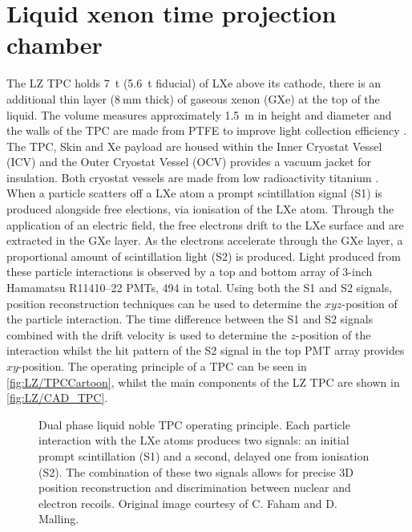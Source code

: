 \section{Liquid xenon time projection chamber}\label{sec:LZ/LXeTPC}
The LZ TPC holds 7~t (5.6~t fiducial) of LXe above its cathode, there is an additional thin layer ($8~\text{mm}$ thick) of gaseous xenon (GXe) at the top of the liquid. The volume measures approximately 1.5~m in height and diameter and the walls of the TPC are made from PTFE to improve light collection efficiency \cite{LZNIMA}. The TPC, Skin and Xe payload are housed within the Inner Cryostat Vessel (ICV) and the Outer Cryostat Vessel (OCV) provides a vacuum jacket for insulation. Both cryostat vessels are made from low radioactivity titanium \cite{LZ:2017iwn}. When a particle scatters off a LXe atom a prompt scintillation signal (S1) is produced alongside free elections, via ionisation of the LXe atom. Through the application of an electric field, the free electrons drift to the LXe surface and are extracted in the GXe layer. As the electrons accelerate through the GXe layer, a proportional amount of scintillation light (S2) is produced. Light produced from these particle interactions is observed by a top and bottom array of 3-inch Hamamatsu R11410–22 PMTs, 494 in total. Using both the S1 and S2 signals, position reconstruction techniques can be used to determine the $xyz$-position of the particle interaction. The time difference between the S1 and S2 signals combined with the drift velocity is used to determine the $z$-position of the interaction whilst the hit pattern of the S2 signal in the top PMT array provides $xy$-position. The operating principle of a TPC can be seen in \autoref{fig:LZ/TPCCartoon}, whilst the main components of the LZ TPC are shown in \autoref{fig:LZ/CAD_TPC}.
\begin{figure}[!ht]
    \centering
    
    \caption{Dual phase liquid noble TPC operating principle. Each particle interaction with the LXe atoms produces two signals: an initial prompt scintillation (S1) and a second, delayed one from ionisation (S2). The combination of these two signals allows for precise 3D position reconstruction and discrimination between nuclear and electron recoils. Original image courtesy of C. Faham and D. Malling.}
    \label{fig:LZ/TPCCartoon}
\end{figure}

